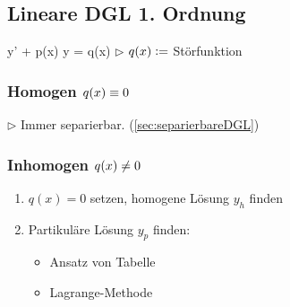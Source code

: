 \subsection{Lineare DGL 1. Ordnung}
    \vspace{0.5em}
    \mathbox%
    {
        y' + p(x) \cdot y = q(x)
    }
    $\triangleright$ $q(x) \vcentcolon=$ Störfunktion
    
    \subsubsection{Homogen $\hfill q(x) \equiv 0$}
        \vspace{0.5em}
        $\triangleright$ Immer separierbar. (\ref{sec:separierbareDGL})
    \subsubsection{Inhomogen $\hfill q(x) \neq 0$}\label{sec:1.Ord-homogen}
        \vspace{0.5em}
        \begin{enumerate}
            \item $q(x) = 0$ setzen, homogene Lösung $y_h$ finden
            \item Partikuläre Lösung $y_p$ finden:
            \begin{itemize}
                \item Ansatz von Tabelle %
                \item Lagrange-Methode %
            \end{itemize}
        \end{enumerate}


